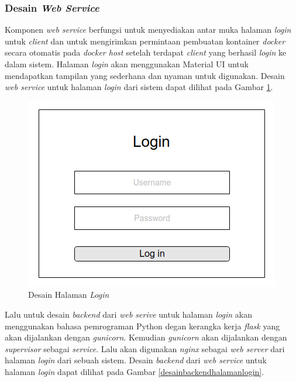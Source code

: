 \subsubsection{Desain \textit{Web Service}}
Komponen \textit{web service} berfungsi untuk menyediakan antar muka halaman \textit{login} untuk \textit{client} dan untuk mengirimkan permintaan pembuatan kontainer \textit{docker} secara otomatis pada \textit{docker host} setelah terdapat \textit{client} yang berhasil \textit{login} ke dalam sistem. Halaman \textit{login} akan menggunakan Material UI untuk mendapatkan tampilan yang sederhana dan nyaman untuk digunakan. Desain \textit{web service} untuk halaman \textit{login} dari sistem dapat dilihat pada Gambar \ref{mockuplogin}.

\begin{figure}[H]
	\centering
	\includegraphics[width=\linewidth]{images/bab3/MockupLogin}
	\caption{Desain Halaman \textit{Login}}
	\label{mockuplogin}
\end{figure}

Lalu untuk desain \textit{backend} dari \textit{web serive} untuk halaman \textit{login} akan menggunakan bahasa pemrograman Python degan kerangka kerja \textit{flask} yang akan dijalankan dengan \textit{gunicorn}. Kemudian \textit{gunicorn} akan dijalankan dengan \textit{supervisor} sebagai \textit{service}. Lalu akan digunakan \textit{nginx} sebagai \textit{web server} dari halaman \textit{login} dari sebuah sistem. Desain \textit{backend} dari \textit{web service} untuk halaman \textit{login} dapat dilihat pada Gambar \ref{desainbackendhalamanlogin}.

